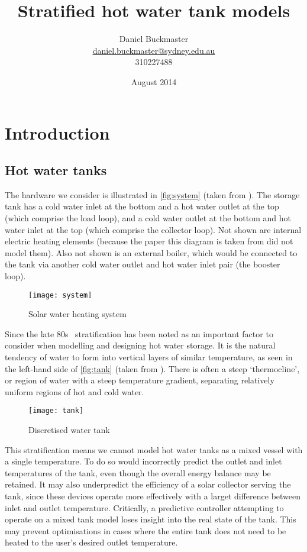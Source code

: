 \documentclass{article}
\title{Stratified hot water tank models}
\date{August 2014}
\author{Daniel Buckmaster \\
        \href{mailto:daniel.buckmaster@sydney.edu.au}{daniel.buckmaster@sydney.edu.au} \\
        310227488}
\begin{document}
\maketitle

\section{Introduction}

\subsection{Hot water tanks}

The hardware we consider is illustrated in \autoref{fig:system} (taken from \textcite{Cristofari02}).
The storage tank has a cold water inlet at the bottom and a hot water outlet at the top (which comprise the load loop), and a cold water outlet at the bottom and hot water inlet at the top (which comprise the collector loop).
Not shown are internal electric heating elements (because the paper this diagram is taken from did not model them).
Also not shown is an external boiler, which would be connected to the tank via another cold water outlet and hot water inlet pair (the booster loop).

\begin{figure}
   \centering
   \texttt{[image: system]}
   \caption{Solar water heating system}
   \label{fig:system}
\end{figure}

Since the late 80s~\cite{Hollands89} stratification has been noted as an important factor to consider when modelling and designing hot water storage.
It is the natural tendency of water to form into vertical layers of similar temperature, as seen in the left-hand side of \autoref{fig:tank} (taken from \textcite{Pfeiffer11}).
There is often a steep `thermocline', or region of water with a steep temperature gradient, separating relatively uniform regions of hot and cold water.

\begin{figure}
   \centering
   \texttt{[image: tank]}
   \caption{Discretised water tank}
   \label{fig:tank}
\end{figure}

This stratification means we cannot model hot water tanks as a mixed vessel with a single temperature.
To do so would incorrectly predict the outlet and inlet temperatures of the tank, even though the overall energy balance may be retained.
It may also underpredict the efficiency of a solar collector serving the tank, since these devices operate more effectively with a larget difference between inlet and outlet temperature.
Critically, a predictive controller attempting to operate on a mixed tank model loses insight into the real state of the tank.
This may prevent optimisations in cases where the entire tank does not need to be heated to the user's desired outlet temperature.
\end{document}

